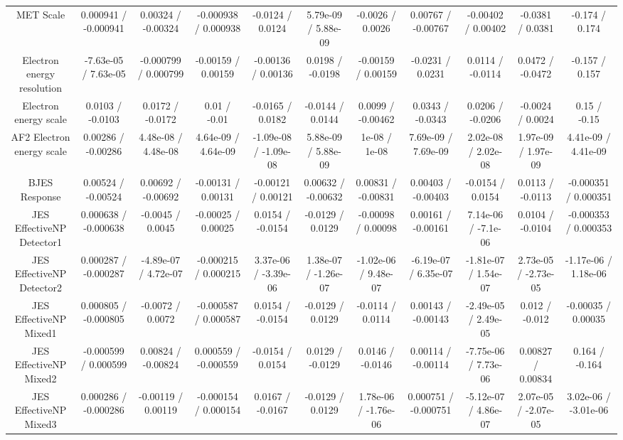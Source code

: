 {\begin{landscape}
\begin{longtable}{@{\extracolsep{\fill}}| *{11}{c|}}
  MET Scale & 0.000941 / -0.000941 & 0.00324 / -0.00324 & -0.000938 / 0.000938 & -0.0124 / 0.0124 & 5.79e-09 / 5.88e-09 & -0.0026 / 0.0026 & 0.00767 / -0.00767 & -0.00402 / 0.00402 & -0.0381 / 0.0381 & -0.174 / 0.174 \\ 
  Electron energy resolution & -7.63e-05 / 7.63e-05 & -0.000799 / 0.000799 & -0.00159 / 0.00159 & -0.00136 / 0.00136 & 0.0198 / -0.0198 & -0.00159 / 0.00159 & -0.0231 / 0.0231 & 0.0114 / -0.0114 & 0.0472 / -0.0472 & -0.157 / 0.157 \\ 
  Electron energy scale & 0.0103 / -0.0103 & 0.0172 / -0.0172 & 0.01 / -0.01 & -0.0165 / 0.0182 & -0.0144 / 0.0144 & 0.0099 / -0.00462 & 0.0343 / -0.0343 & 0.0206 / -0.0206 & -0.0024 / 0.0024 & 0.15 / -0.15 \\ 
  AF2 Electron energy scale & 0.00286 / -0.00286 & 4.48e-08 / 4.48e-08 & 4.64e-09 / 4.64e-09 & -1.09e-08 / -1.09e-08 & 5.88e-09 / 5.88e-09 & 1e-08 / 1e-08 & 7.69e-09 / 7.69e-09 & 2.02e-08 / 2.02e-08 & 1.97e-09 / 1.97e-09 & 4.41e-09 / 4.41e-09 \\ 
  BJES Response & 0.00524 / -0.00524 & 0.00692 / -0.00692 & -0.00131 / 0.00131 & -0.00121 / 0.00121 & 0.00632 / -0.00632 & 0.00831 / -0.00831 & 0.00403 / -0.00403 & -0.0154 / 0.0154 & 0.0113 / -0.0113 & -0.000351 / 0.000351 \\ 
  JES EffectiveNP Detector1 & 0.000638 / -0.000638 & -0.0045 / 0.0045 & -0.00025 / 0.00025 & 0.0154 / -0.0154 & -0.0129 / 0.0129 & -0.00098 / 0.00098 & 0.00161 / -0.00161 & 7.14e-06 / -7.1e-06 & 0.0104 / -0.0104 & -0.000353 / 0.000353 \\ 
  JES EffectiveNP Detector2 & 0.000287 / -0.000287 & -4.89e-07 / 4.72e-07 & -0.000215 / 0.000215 & 3.37e-06 / -3.39e-06 & 1.38e-07 / -1.26e-07 & -1.02e-06 / 9.48e-07 & -6.19e-07 / 6.35e-07 & -1.81e-07 / 1.54e-07 & 2.73e-05 / -2.73e-05 & -1.17e-06 / 1.18e-06 \\ 
  JES EffectiveNP Mixed1 & 0.000805 / -0.000805 & -0.0072 / 0.0072 & -0.000587 / 0.000587 & 0.0154 / -0.0154 & -0.0129 / 0.0129 & -0.0114 / 0.0114 & 0.00143 / -0.00143 & -2.49e-05 / 2.49e-05 & 0.012 / -0.012 & -0.00035 / 0.00035 \\ 
  JES EffectiveNP Mixed2 & -0.000599 / 0.000599 & 0.00824 / -0.00824 & 0.000559 / -0.000559 & -0.0154 / 0.0154 & 0.0129 / -0.0129 & 0.0146 / -0.0146 & 0.00114 / -0.00114 & -7.75e-06 / 7.73e-06 & 0.00827 / 0.00834 & 0.164 / -0.164 \\ 
  JES EffectiveNP Mixed3 & 0.000286 / -0.000286 & -0.00119 / 0.00119 & -0.000154 / 0.000154 & 0.0167 / -0.0167 & -0.0129 / 0.0129 & 1.78e-06 / -1.76e-06 & 0.000751 / -0.000751 & -5.12e-07 / 4.86e-07 & 2.07e-05 / -2.07e-05 & 3.02e-06 / -3.01e-06 \\ 

\end{longtable}
\end{landscape}}

